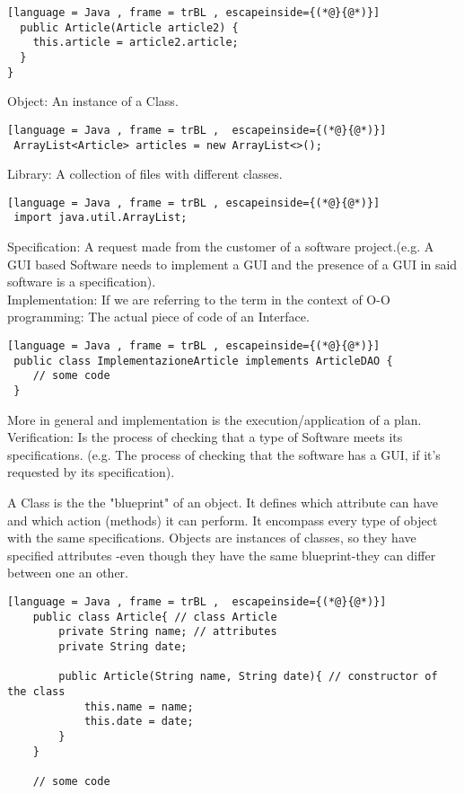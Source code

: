 \begin{parlist}
\begin{lstlisting}[language = Java , frame = trBL , escapeinside={(*@}{@*)}]
  public Article(Article article2) {
    this.article = article2.article;  
  }
}	
 \end{lstlisting}

  Object: An instance of a Class. 
 \begin{lstlisting}[language = Java , frame = trBL ,  escapeinside={(*@}{@*)}]
 ArrayList<Article> articles = new ArrayList<>();	
 \end{lstlisting}
Library: A collection of files with different classes.
 \begin{lstlisting}[language = Java , frame = trBL , escapeinside={(*@}{@*)}]
 import java.util.ArrayList;	
 \end{lstlisting}

  Specification: A request made from the customer of a software project.(e.g. A GUI based Software needs to implement a GUI and the presence of a GUI in said software is a specification).\cite{8055462} \\
  \newline
  Implementation: If we are referring to the term in the context of O-O programming: The actual piece of code of an Interface.
 \begin{lstlisting}[language = Java , frame = trBL , escapeinside={(*@}{@*)}]
 public class ImplementazioneArticle implements ArticleDAO {
 	// some code
 }	
 \end{lstlisting}
 More in general and implementation is the execution/application of a plan.\cite{:2011aa}\\
  Verification: Is the process of checking that a type of Software meets its specifications. (e.g. The process of checking that the software has a GUI, if it's requested by its specification).\cite{8055462}
	\item A Class is the the "blueprint" of an object. It defines which attribute can have and which action (methods) it can perform. It encompass every type of object with the same specifications. Objects are instances of classes, so they have specified attributes -even though they have the same blueprint-they can differ between one an other.
	\begin{lstlisting}[language = Java , frame = trBL ,  escapeinside={(*@}{@*)}]
	public class Article{ // class Article
		private String name; // attributes
		private String date;
		
		public Article(String name, String date){ // constructor of the class
			this.name = name;
			this.date = date;
		}
	}	
	
	// some code
	

\end{lstlisting}
\end{parlist}

